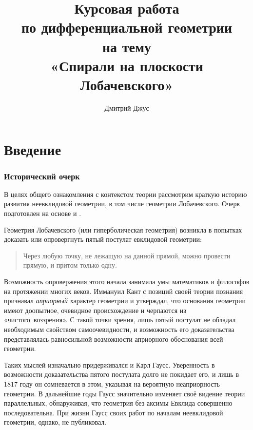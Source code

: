 \documentclass{article}
\numberwithin{equation}{section}
\begin{document}
\author{Дмитрий Джус}
\title{Курсовая работа\\ по дифференциальной геометрии\\ на тему \\
  \Huge{«Спирали на плоскости Лобачевского»}}
\pretitle{\begin{center}\LARGE}
\posttitle{\par\end{center}\vskip 3pc}
\date{}
\maketitle
\thispagestyle{empty}

\clearpage

\tableofcontents
\clearpage

\listoffigures
\clearpage

\part{Введение}

\section{Исторический очерк}
\label{sec:intro}

В целях общего ознакомления с контекстом теории рассмотрим краткую
историю развития неевклидовой геометрии, в том числе геометрии
Лобачевского. Очерк подготовлен на основе \cite{milnor82} и
\cite{norden56}.

Геометрия Лобачевского (или гиперболическая геометрия) возникла в
попытках доказать или опровергнуть пятый постулат евклидовой
геометрии:

\begin{quote}
  Через любую точку, не лежащую на данной прямой, можно провести
  прямую, и притом только одну.
\end{quote}

Возможность опровержения этого начала занимала умы математиков и
философов на протяжении многих веков. Иммануил Кант с позиций своей
теории познания признавал \emph{априорный} характер геометрии и
утверждал, что основания геометрии имеют доопытное, очевидное
происхождение и черпаются из «чистого воззрения». С такой точки
зрения, лишь пятый постулат не обладал необходимым свойством
самоочевидности, и возможность его доказательства представлялась
равносильной возможности априорного обоснования всей геометрии.

Таких мыслей изначально придерживался и Карл Гаусс. Уверенность в
возможности доказательства пятого постулата долго не покидает его, и
лишь в 1817 году он сомневается в этом, указывая на вероятную
неаприорность геометрии. В дальнейшие годы Гаусс значительно изменяет
своё видение теории параллельных, обнаруживая, что геометрия без
аксимы Евклида совершенно последовательна. При жизни Гаусс своих работ
по началам неевклидовой геометрии, однако, не публиковал.
\end{document}

